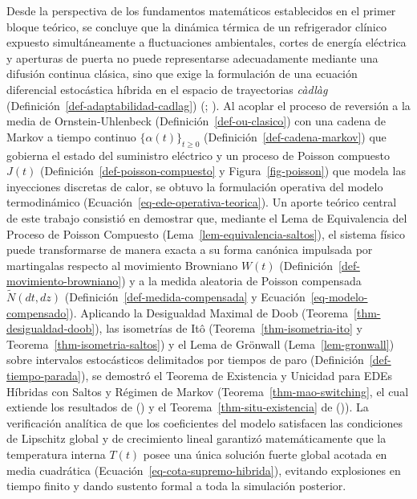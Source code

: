 \documentclass[
  spanish,
  letterpaper,
  DIV=11,
  numbers=noendperiod]{scrreprt}
\theoremstyle{plain}
\theoremstyle{plain}
\theoremstyle{plain}
\theoremstyle{definition}
\theoremstyle{remark}
\begin{document}
Desde la perspectiva de los fundamentos matemáticos establecidos en el
primer bloque teórico, se concluye que la dinámica térmica de un
refrigerador clínico expuesto simultáneamente a fluctuaciones
ambientales, cortes de energía eléctrica y aperturas de puerta no puede
representarse adecuadamente mediante una difusión continua clásica, sino
que exige la formulación de una ecuación diferencial estocástica híbrida
en el espacio de trayectorias \emph{càdlàg}
(Definición~\ref{def-adaptabilidad-cadlag})
(;
). Al acoplar el proceso de
reversión a la media de Ornstein-Uhlenbeck
(Definición~\ref{def-ou-clasico}) con una cadena de Markov a tiempo
continuo \(\{\alpha(t)\}_{t \ge 0}\)
(Definición~\ref{def-cadena-markov}) que gobierna el estado del
suministro eléctrico y un proceso de Poisson compuesto \(J(t)\)
(Definición~\ref{def-poisson-compuesto} y Figura~\ref{fig-poisson}) que
modela las inyecciones discretas de calor, se obtuvo la formulación
operativa del modelo termodinámico
(Ecuación~\ref{eq-ede-operativa-teorica}). Un aporte teórico central de
este trabajo consistió en demostrar que, mediante el Lema de
Equivalencia del Proceso de Poisson Compuesto
(Lema~\ref{lem-equivalencia-saltos}), el sistema físico puede
transformarse de manera exacta a su forma canónica impulsada por
martingalas respecto al movimiento Browniano \(W(t)\)
(Definición~\ref{def-movimiento-browniano}) y a la medida aleatoria de
Poisson compensada \(\tilde{N}(dt, dz)\)
(Definición~\ref{def-medida-compensada} y
Ecuación~\ref{eq-modelo-compensado}). Aplicando la Desigualdad Maximal
de Doob (Teorema~\ref{thm-desigualdad-doob}), las isometrías de Itô
(Teorema~\ref{thm-isometria-ito} y Teorema~\ref{thm-isometria-saltos}) y
el Lema de Grönwall (Lema~\ref{lem-gronwall}) sobre intervalos
estocásticos delimitados por tiempos de paro
(Definición~\ref{def-tiempo-parada}), se demostró el Teorema de
Existencia y Unicidad para EDEs Híbridas con Saltos y Régimen de Markov
(Teorema~\ref{thm-mao-switching}, el cual extiende los resultados de
() y el
Teorema~\ref{thm-situ-existencia} de ()). La verificación analítica de que los coeficientes del modelo
satisfacen las condiciones de Lipschitz global y de crecimiento lineal
garantizó matemáticamente que la temperatura interna \(T(t)\) posee una
única solución fuerte global acotada en media cuadrática
(Ecuación~\ref{eq-cota-supremo-hibrida}), evitando explosiones en tiempo
finito y dando sustento formal a toda la simulación posterior.
\end{document}
